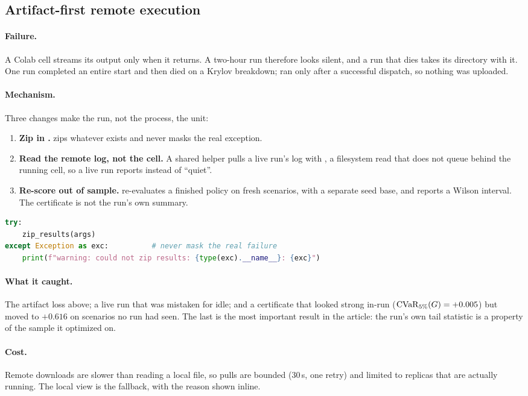 \subsection{Artifact-first remote execution}
\label{sec:remote}

\paragraph{Failure.} A Colab cell streams its output only when it returns. A
two-hour run therefore looks silent, and a run that dies takes its
 directory with it. One run completed an entire start and then
died on a Krylov breakdown;  ran only after a successful
dispatch, so nothing was uploaded.

\paragraph{Mechanism.} Three changes make the run, not the process, the unit:
\begin{enumerate}
  \item \textbf{Zip in .}  zips
        whatever exists and never masks the real exception.
  \item \textbf{Read the remote log, not the cell.} A shared helper pulls a
        live run's log with , a filesystem read that does
        not queue behind the running cell, so a live run reports
         instead of ``quiet''.
  \item \textbf{Re-score out of sample.}  re-evaluates a
        finished policy on fresh scenarios, with a separate seed base, and
        reports a Wilson interval. The certificate is not the run's own summary.
\end{enumerate}

\begin{lstlisting}[language=Python,caption={The zip belongs in a \code{finally},
and the zip error must not replace the real one.}]
try:
    zip_results(args)
except Exception as exc:          # never mask the real failure
    print(f"warning: could not zip results: {type(exc).__name__}: {exc}")
\end{lstlisting}

\paragraph{What it caught.} The artifact loss above; a live run that was
mistaken for idle; and a certificate that looked strong in-run
($\mathrm{CVaR}_{5\%}(G)=+0.005$) but moved to $+0.616$ on scenarios no run had seen.
The last is the most important result in the article: the run's own tail
statistic is a property of the sample it optimized on.

\paragraph{Cost.} Remote downloads are slower than reading a local file, so
pulls are bounded (30\,s, one retry) and limited to replicas that are actually
running. The local view is the fallback, with the reason shown inline.
